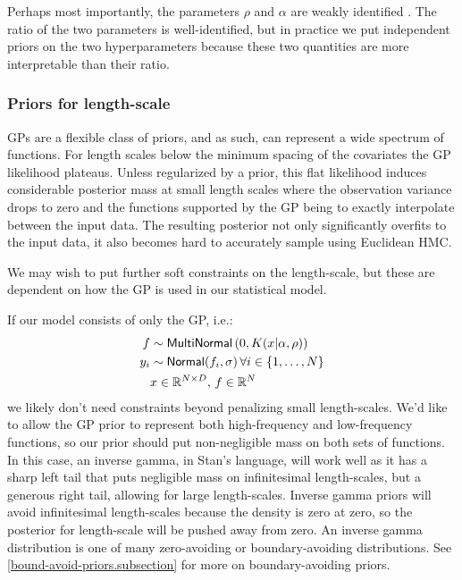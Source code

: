 Perhaps most importantly, the parameters $\rho$ and $\alpha$ are weakly
identified \citep{zhang-gp:2004}. The ratio of the two
parameters is well-identified, but in practice we put independent priors on the
two hyperparameters because these two quantities are more interpretable than
their ratio.

\subsubsection{Priors for length-scale}

GPs are a flexible class of priors, and as such, can represent a wide spectrum
of functions.  For length scales below the minimum spacing of the covariates
the GP likelihood plateaus.  Unless regularized by a prior, this flat
likelihood induces considerable posterior mass at small length scales where the
observation variance drops to zero and the functions supported by the GP being
to exactly interpolate between the input data.  The resulting posterior not
only significantly overfits to the input data, it also becomes hard to
accurately sample using Euclidean HMC.

We may wish to put further soft constraints on the length-scale, but these are
dependent on how the GP is used in our statistical model.

If our model consists of only the GP, i.e.:
%
\begin{align*}
  f & \sim \mbox{\sf MultiNormal}\left(0, K(x | \alpha, \rho)\right) \\
  y_i & \sim \mbox{\sf Normal}(f_i, \sigma) \, \forall i \in \{1, \dots, N\} \\
  & x \in \mathbb{R}^{N \times D}, \, f \in \mathbb{R}^N
\end{align*}
%
we likely don't need constraints beyond penalizing small
length-scales.  We'd like to allow the GP prior to represent both
high-frequency and low-frequency functions, so our prior should put
non-negligible mass on both sets of functions.  In this case, an
inverse gamma,  in Stan’s language, will work
well as it has a sharp left tail that puts negligible mass on
infinitesimal length-scales, but a generous right tail, allowing for
large length-scales. Inverse gamma priors will avoid infinitesimal length-scales
because the density is zero at zero, so the posterior for length-scale will be
pushed away from zero. An inverse gamma distribution is one of many
zero-avoiding or boundary-avoiding distributions. See
\ref{bound-avoid-priors.subsection} for more on boundary-avoiding priors.

